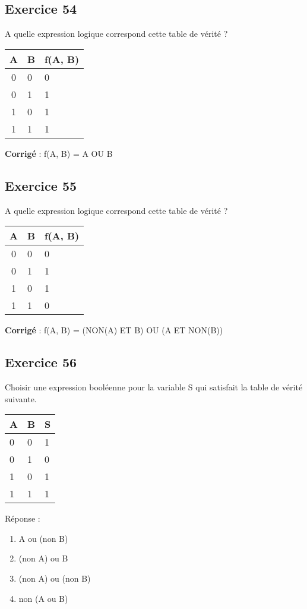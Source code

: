 \documentclass[11pt]{article}
\providecommand{\tightlist}{%
      \setlength{\itemsep}{0pt}\setlength{\parskip}{0pt}}
\begin{document}
    \hypertarget{exercice-54}{%
\subsection{Exercice 54}\label{exercice-54}}

A quelle expression logique correspond cette table de vérité ?

\begin{longtable}[]{@{}cll@{}}
\toprule
A & B & f(A, B)\tabularnewline
\midrule
\endhead
0 & 0 & 0\tabularnewline
0 & 1 & 1\tabularnewline
1 & 0 & 1\tabularnewline
1 & 1 & 1\tabularnewline
\bottomrule
\end{longtable}

    \textbf{Corrigé} : f(A, B) = A OU B

    \hypertarget{exercice-55}{%
\subsection{Exercice 55}\label{exercice-55}}

A quelle expression logique correspond cette table de vérité ?

\begin{longtable}[]{@{}cll@{}}
\toprule
A & B & f(A, B)\tabularnewline
\midrule
\endhead
0 & 0 & 0\tabularnewline
0 & 1 & 1\tabularnewline
1 & 0 & 1\tabularnewline
1 & 1 & 0\tabularnewline
\bottomrule
\end{longtable}

    \textbf{Corrigé} : f(A, B) = (NON(A) ET B) OU (A ET NON(B))

    \hypertarget{exercice-56}{%
\subsection{Exercice 56}\label{exercice-56}}

Choisir une expression booléenne pour la variable S qui satisfait la
table de vérité suivante.

\begin{longtable}[]{@{}lll@{}}
\toprule
A & B & S\tabularnewline
\midrule
\endhead
0 & 0 & 1\tabularnewline
0 & 1 & 0\tabularnewline
1 & 0 & 1\tabularnewline
1 & 1 & 1\tabularnewline
\bottomrule
\end{longtable}

Réponse :

\begin{enumerate}
\def\labelenumi{\arabic{enumi}.}
\tightlist
\item
  A ou (non B)
\item
  (non A) ou B
\item
  (non A) ou (non B)
\item
  non (A ou B)
\end{enumerate}
\end{document}
